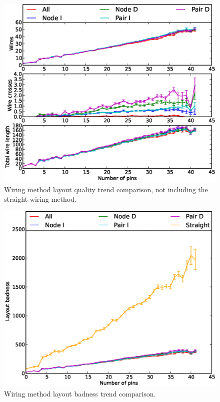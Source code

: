 \begin{figure}
\begin{center}
\includegraphics[width=\textwidth]{Images/wiring_quality_trend_comparison_no_straight.eps}
\caption[Wiring method layout quality trend comparison (without straight wiring)]
{Wiring method layout quality trend comparison, not including the straight
wiring method.}
\label{fig:wiring_quality_trend_no_straight}
\end{center}
\end{figure}

\begin{figure}
\begin{center}
\includegraphics[width=\textwidth]{Images/wiring_badness_trend_comparison.eps}
\caption[Wiring method layout badness trend comparison]{Wiring method layout
badness trend comparison.}
\label{fig:wiring_badness_trend}
\end{center}
\end{figure}

